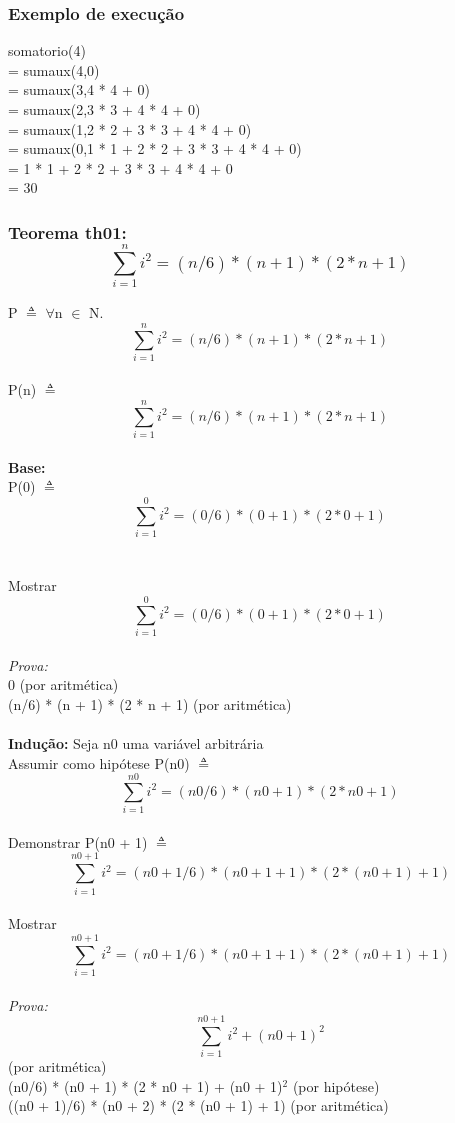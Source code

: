 \documentclass{article}
\begin{document}
\subsubsection{Exemplo de execução}
somatorio(4) 
\\= sumaux(4,0)
\\= sumaux(3,4 * 4 + 0)
\\= sumaux(2,3 * 3 + 4 * 4 + 0)
\\= sumaux(1,2 * 2 + 3 * 3 + 4 * 4 + 0)
\\= sumaux(0,1 * 1 + 2 * 2 + 3 * 3 + 4 * 4 + 0)
\\= 1 * 1 + 2 * 2 + 3 * 3 + 4 * 4 + 0
\\= 30

\subsubsection{Teorema th01: $$\sum_{i=1}^{n} i^{2} = (n/6) * (n + 1) * (2 * n + 1)$$ }
P $\triangleq$ $\forall$n $\in$ N. $$\sum_{i=1}^{n} i^{2} = (n/6) * (n + 1) * (2 * n + 1)$$
\\P(n) $\triangleq$ $$\sum_{i=1}^{n} i^{2} = (n/6) * (n + 1) * (2 * n + 1)$$
\\
\textbf{Base:}
\\P(0) $\triangleq$ $$\sum_{i=1}^{0} i^{2} = (0/6) * (0 + 1) * (2 * 0 + 1)$$
\\
\\Mostrar $$\sum_{i=1}^{0} i^{2} = (0/6) * (0 + 1) * (2 * 0 + 1)$$
\\\textit{Prova:}
\\0 (por aritmética)
\\ (n/6) * (n + 1) * (2 * n + 1) (por aritmética)
\\
\\
\textbf{Indução:}
Seja n0 uma variável arbitrária
\\Assumir como hipótese P(n0) $\triangleq$ $$\sum_{i=1}^{n0} i^{2} = (n0/6) * (n0 + 1) * (2 * n0 + 1)$$
\\Demonstrar P(n0 + 1) $\triangleq$ $$\sum_{i=1}^{n0 + 1} i^{2} = (n0 + 1/6) * (n0 + 1 + 1) * (2 * (n0 + 1) + 1)$$
\\Mostrar $$\sum_{i=1}^{n0 + 1} i^{2} = (n0 + 1/6) * (n0 + 1 + 1) * (2 * (n0 + 1) + 1)$$
\\\textit{Prova:}
\\$$\sum_{i=1}^{n0 + 1} i^{2} + (n0 + 1)^{2}$$ (por aritmética)
\\(n0/6) * (n0 + 1) * (2 * n0 + 1) + (n0 + 1)$^{2}$ (por hipótese)
\\((n0 + 1)/6) * (n0 + 2) * (2 * (n0 + 1) + 1) (por aritmética)
\end{document}
